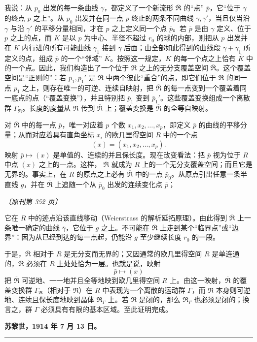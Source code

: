\documentclass[UTF8,11pt,a4paper,fontset=none]{ctexart}
\theoremstyle{weylthm}
\newcommand{\origpage}[1]{%
  \par\vspace{0.7em}\noindent\hfill{\small\itshape〔原刊第 #1 页〕}\par\vspace{0.25em}}
\begin{document}
我说：从 \(p_0\) 出发的每一条曲线 \(\gamma\)，都定义了一个新流形
\(\overline{\mathfrak R}\) 的“点” \(\bar p\)，它“位于 \(\gamma\) 的终点
\(p\) 之上”。从 \(p_0\) 出发并在同一点 \(p\) 终止的两条不同曲线
\(\gamma,\gamma'\)，当且仅当沿 \(\gamma\) 与沿 \(\gamma'\) 的平移分量相同，才在
\(p\) 之上定义同一个点 \(\bar p\)。若 \(\bar p\) 是由 \(\gamma\) 定义、位于
\(p\) 之上的点，而 \(K\) 是以 \(p\) 为中心、半径不超过 \(r_0\) 的球的内部，则把从
\(p\) 出发并在 \(K\) 内行进的所有可能曲线 \(\gamma_1\) 接到 \(\gamma\) 后面；由全部如此得到的曲线段
\(\gamma+\gamma_1\) 所定义的点，组成 \(\bar p\) 的一个“邻域”
\(\overline K\)。按照这一规定，\(K\) 的每一个点之上恰有 \(\overline K\) 中的一个点。因此，我们构造出了一个位于
\(\mathfrak R\) 之上的无分支覆盖空间 \(\overline{\mathfrak R}\)。这个覆盖空间是“正则的”：若
\(\bar p_1,\bar p_1'\) 是 \(\overline{\mathfrak R}\) 中两个彼此“重合”的点，即它们位于
\(\mathfrak R\) 的同一点 \(p_1\) 之上，则存在唯一的可逆、连续自映射，把
\(\overline{\mathfrak R}\) 的每一点变到一个覆盖着同一底点的点（“覆盖变换”），并且特别把
\(\bar p_1\) 变到 \(\bar p_1'\)。这些覆盖变换组成一个离散群
\(\Gamma_{\mathfrak R}\)。长度的度量从 \(\mathfrak R\) 传到
\(\overline{\mathfrak R}\) 上；覆盖变换是 \(\overline{\mathfrak R}\) 的全等自映射。

对 \(\overline{\mathfrak R}\) 中的每一点 \(\bar p\)，唯一对应着 \(p\) 个数
\(x_1,x_2,\ldots,x_p\)，即定义 \(\bar p\) 的曲线的平移分量；从而对应着具有直角坐标
\(x_i\) 的欧几里得空间 \(R\) 中的一个点
\[
  (x)=(x_1,x_2,\ldots,x_p).
\]
映射 \(\bar p\mapsto(x)\) 是单值的、连续的并且保长度。现在改变看法：把
\(\bar p\) 视为位于 \(R\) 中点 \((x)\) 之上的一点。这样，
\(\overline{\mathfrak R}\) 就成为 \(R\) 上的一个无分支覆盖空间；而且它是无界的。事实上，在
\(R\) 的原点之上必有 \(\overline{\mathfrak R}\) 中的一点 \(\bar p_0\)。从原点引出任意一条半直线
\(g\)，并在 \(\overline{\mathfrak R}\) 上追随一个从 \(\bar p_0\) 出发的连续变化点 \(\bar p\)；

\origpage{352}

它在 \(R\) 中的迹点沿该直线移动（Weierstrass 的解析延拓原理）。由此得到
\(\overline{\mathfrak R}\) 上一条唯一确定的曲线 \(\bar\gamma\)，它位于
\(g\) 之上。不可能在 \(\overline{\mathfrak R}\) 上走到某个“临界点”或“边界”：因为从已经到达的每一点起，仍能沿
\(g\) 至少继续长度 \(r_0\) 的一段。

于是，\(\overline{\mathfrak R}\) 相对于 \(R\) 是无分支而无界的；又因通常的欧几里得空间
\(R\) 是单连通的，\(\overline{\mathfrak R}\) 必须在 \(R\) 上处处恰为一层。也就是说，映射
\[
  \bar p\longmapsto(x)
\]
把 \(\overline{\mathfrak R}\) 可逆地、一一地并且全等地映到欧几里得空间
\(R\) 上。由这一映射，\(\overline{\mathfrak R}\) 的覆盖变换群
\(\Gamma_{\mathfrak R}\)（相对于 \(\mathfrak R\)）在 \(R\) 中表现为一个离散的运动群
\(\Gamma\)，而 \(\mathfrak R\) 本身则可逆地、连续且保长度地映到晶体
\(\mathfrak R_\Gamma\) 上。若 \(\mathfrak R\) 是闭的，那么
\(\mathfrak R_\Gamma\) 也必须是闭的；换言之，群 \(\Gamma\) 必须具有有限的基本区域。至此证明完成。

\begin{flushright}
\textbf{苏黎世，1914 年 7 月 13 日。}
\end{flushright}

\vspace{3em}
\begin{center}
\rule{0.28\textwidth}{0.4pt}
\end{center}
\end{document}

